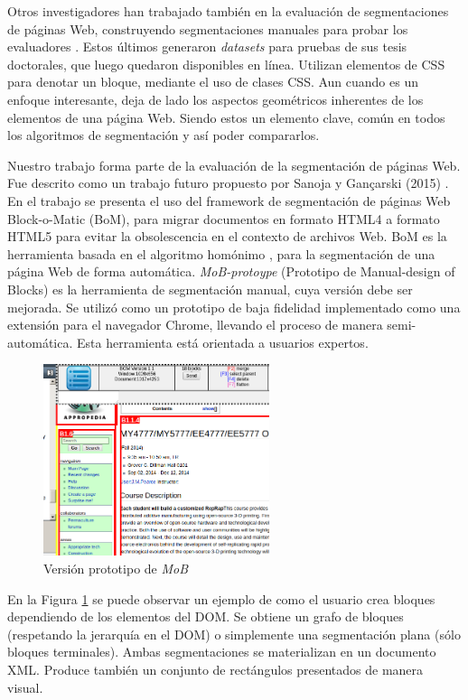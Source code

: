 \documentclass[10pt]{revecom}
\begin{document}
Otros investigadores han trabajado también en la evaluación de segmentaciones de páginas Web, construyendo segmentaciones manuales para probar los evaluadores \cite{bjdmnmd2019,krh2015}. 
Estos últimos generaron \textit{datasets} para pruebas de sus tesis doctorales, que luego quedaron disponibles en línea. Utilizan elementos de CSS para denotar un bloque, mediante el uso de clases CSS.
Aun cuando es un enfoque interesante, deja de lado los aspectos geométricos inherentes de los elementos de una página Web. Siendo estos un elemento clave, común en todos los algoritmos de segmentación y así poder compararlos. 

Nuestro trabajo forma parte de la evaluación de la segmentación de páginas Web. 
Fue descrito como un trabajo futuro propuesto por Sanoja y Gançarski (2015) \cite{Sanoja:LIP6:2015,SanGan:SAC:2015}.
%
En el trabajo se presenta el uso del framework de segmentación de páginas Web Block-o-Matic (BoM), para migrar documentos en formato HTML4 a formato HTML5 para evitar la obsolescencia en el contexto de archivos Web.
%
BoM es la herramienta basada en el algoritmo homónimo \cite{Sanoja:ICMCS:2014}, para la segmentación de una página Web de forma automática. 
\emph{MoB-protoype} (Prototipo de Manual-design of Blocks) es la herramienta de segmentación manual, cuya versión debe ser mejorada.
Se utilizó como un prototipo de baja fidelidad implementado como una extensión para el navegador Chrome, llevando el proceso de manera semi-automática. Esta herramienta está orientada a usuarios expertos.

\begin{figure}[htbp]
\centerline{\includegraphics[width=250px]{old-mob.png}}
\caption{Versión prototipo de  \emph{MoB}}
\label{fig1}
\end{figure}

En la Figura \ref{fig1} se puede observar un ejemplo de como el usuario crea bloques dependiendo de los elementos del DOM. 
Se obtiene un grafo de bloques (respetando la jerarquía en el DOM) o simplemente una segmentación plana (sólo bloques terminales). 
Ambas segmentaciones se materializan en un documento XML. 
Produce también un conjunto de rectángulos presentados de manera visual.
\end{document}
